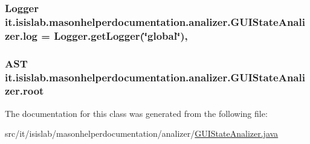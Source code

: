 \hypertarget{classit_1_1isislab_1_1masonhelperdocumentation_1_1analizer_1_1_g_u_i_state_analizer_abfa6779bca8bb8d68bd379cc28da4800}{
\subsubsection[{log}]{\setlength{\rightskip}{0pt plus 5cm}Logger it.\-isislab.\-masonhelperdocumentation.\-analizer.\-G\-U\-I\-State\-Analizer.\-log = Logger.\-get\-Logger(\char`\"{}global\char`\"{})\hspace{0.3cm}{\ttfamily [static]}, {\ttfamily [private]}}}\label{classit_1_1isislab_1_1masonhelperdocumentation_1_1analizer_1_1_g_u_i_state_analizer_abfa6779bca8bb8d68bd379cc28da4800}
\hypertarget{classit_1_1isislab_1_1masonhelperdocumentation_1_1analizer_1_1_g_u_i_state_analizer_aef3b13094b99816005f5993cf73e7d43}{
\subsubsection[{root}]{\setlength{\rightskip}{0pt plus 5cm}A\-S\-T it.\-isislab.\-masonhelperdocumentation.\-analizer.\-G\-U\-I\-State\-Analizer.\-root\hspace{0.3cm}{\ttfamily [private]}}}\label{classit_1_1isislab_1_1masonhelperdocumentation_1_1analizer_1_1_g_u_i_state_analizer_aef3b13094b99816005f5993cf73e7d43}


The documentation for this class was generated from the following file\-:\begin{DoxyCompactItemize}
\item 
src/it/isislab/masonhelperdocumentation/analizer/\hyperlink{_g_u_i_state_analizer_8java}{G\-U\-I\-State\-Analizer.\-java}\end{DoxyCompactItemize}
